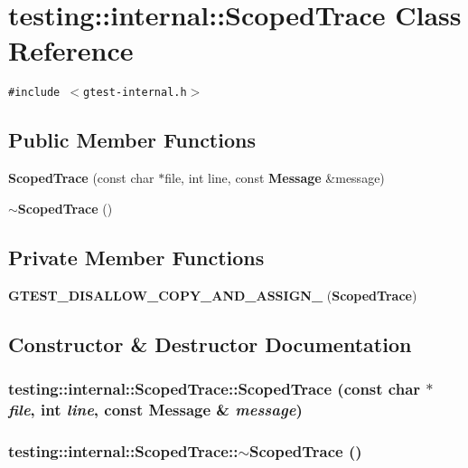 \section{testing::internal::ScopedTrace Class Reference}
\label{classtesting_1_1internal_1_1ScopedTrace}
{\tt \#include $<$gtest-internal.h$>$}

\subsection*{Public Member Functions}
\begin{CompactItemize}
\item 
{\bf ScopedTrace} (const char $\ast$file, int line, const {\bf Message} \&message)
\item 
{\bf $\sim$ScopedTrace} ()
\end{CompactItemize}
\subsection*{Private Member Functions}
\begin{CompactItemize}
\item 
{\bf GTEST\_\-DISALLOW\_\-COPY\_\-AND\_\-ASSIGN\_\-} ({\bf ScopedTrace})
\end{CompactItemize}


\subsection{Constructor \& Destructor Documentation}
\subsubsection{\setlength{\rightskip}{0pt plus 5cm}testing::internal::ScopedTrace::ScopedTrace (const char $\ast$ {\em file}, int {\em line}, const {\bf Message} \& {\em message})}\label{classtesting_1_1internal_1_1ScopedTrace_b3a178be363a3461663352339987fd33}


\subsubsection{\setlength{\rightskip}{0pt plus 5cm}testing::internal::ScopedTrace::$\sim$ScopedTrace ()}\label{classtesting_1_1internal_1_1ScopedTrace_7b0084ab8818cd4609b02d308f1e1dac}




